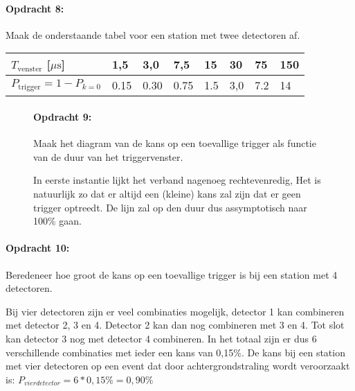 \bigskip{}

\begin{minipage}[t]{1\columnwidth}%

\paragraph{Opdracht 8:}

Maak de onderstaande tabel voor een station met twee detectoren
af.

\bigskip{}

\begin{tabular}{|x{.20\textwidth}|x{.07\textwidth}|x{.07\textwidth}
                |x{.07\textwidth}|x{.07\textwidth}|x{.07\textwidth}
                |x{.07\textwidth}|x{.07\textwidth}|}
    \hline
    $T_\textrm{venster}$ {[}$\mu\mathrm{s}${]} & 1,5 & 3,0 & 7,5 & 15 & 30 & 75 & 150\tabularnewline
    \hline
    $P_\textrm{trigger}=1-P_{k=0}$ & 0.15  & 0.30 & 0.75 & 1.5 & 3,0 & 7.2 & 14\tabularnewline
    \hline
\end{tabular}
\end{minipage}

\bigskip{}


\begin{figure}[h]

\paragraph{Opdracht 9:}

Maak het diagram van de kans op een toevallige trigger als
functie van de duur van het triggervenster.\bigskip{}

In eerste instantie lijkt het verband nagenoeg rechtevenredig, Het
is natuurlijk zo dat er altijd een (kleine) kans zal zijn dat er geen
trigger optreedt. De lijn zal op den duur dus assymptotisch naar 100\%
gaan.
\end{figure}


\bigskip{}


\begin{minipage}[t]{1\columnwidth}%

\paragraph{Opdracht 10:}

Beredeneer hoe groot de kans op een toevallige trigger is
bij een station met 4 detectoren.

\bigskip{}

Bij vier detectoren zijn er veel combinaties mogelijk, detector 1
kan combineren met detector 2, 3 en 4. Detector 2 kan dan nog combineren
met 3 en 4. Tot slot kan detector 3 nog met detector 4 combineren.
In het totaal zijn er dus 6 verschillende combinaties met ieder een
kans van 0,15\%. De kans bij een station met vier detectoren op een
event dat door achtergrondstraling wordt veroorzaakt is: $P_{vierdetector}=6*0,15\%=0,90\%$%
\end{minipage}


